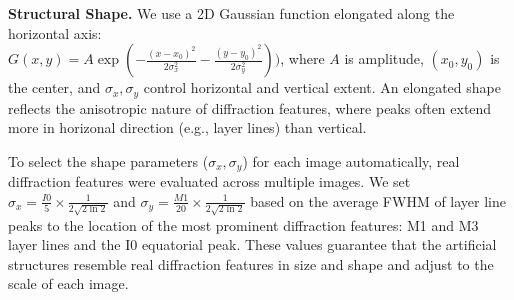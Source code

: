 \documentclass[iucr,review]{iucrjournals}
\begin{document}


\textbf{Structural Shape.}
We use a 2D Gaussian function elongated along the horizontal axis:\\
$ G(x, y) = A \exp(- \frac{(x-x_0)^2}{2\sigma_x^2} - \frac{(y-y_0)^2}{2\sigma_y^2} ))$,
where 
$A$ is amplitude, $(x_0, y_0)$ is the center, and $\sigma_x, \sigma_y$ control horizontal and vertical extent.
An elongated shape reflects the anisotropic nature of diffraction features,
where peaks often extend more in horizonal direction (e.g., layer lines) than vertical.

To select the shape parameters ($\sigma_x, \sigma_y$)
for each image automatically, real diffraction features were evaluated across multiple images.
We set $\sigma_x = \frac{I0}{5}\times \frac{1}{2\sqrt{2 \ln 2}}$ and
$\sigma_y = \frac{M1}{20}\times \frac{1}{2\sqrt{2 \ln 2}}$ based on
the average FWHM of layer line peaks to the location of the most prominent diffraction features:
M1 and M3 layer lines and the I0 equatorial peak. These values guarantee
that the artificial structures resemble real diffraction features in size and shape and adjust to the scale of each image. 
\end{document}

